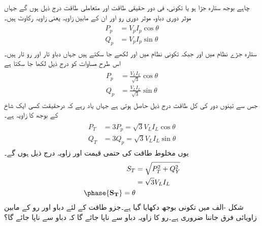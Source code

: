 چاہے بوجھ ستارہ جڑا ہو یا تکونی، فی دور حقیقی طاقت اور  متعاملی طاقت درج ذیل ہوں گے جہاں  موثر دوری دباو،  موثر دوری رو اور  ان کے مابین زاویہ یعنی زاویہ رکاوٹ  ہیں۔
\begin{gather}
\begin{aligned}\label{مساوات_تین_طاقت_حقیقی-متعاملی_الف}
P_p&=V_p I_p \cos \theta\\
Q_p&=V_p I_p \sin \theta
\end{aligned}
\end{gather} 
ستارہ جڑے نظام میں  اور  جبکہ تکونی نظام میں  اور  لکھے جا سکتے ہیں جہاں  دباو تار اور  رو تار ہیں۔ اس طرح  مساوات  کو درج ذیل لکھا جا سکتا ہے
\begin{gather}
\begin{aligned}\label{مساوات_تین_طاقت_حقیقی-متعاملی_ب}
P_p&=\frac{V_L I_L}{\sqrt{3}} \cos \theta\\
Q_p&=\frac{V_L I_L}{\sqrt{3}} \sin \theta
\end{aligned}
\end{gather}
جس سے تینوں دور کی کل طاقت درج ذیل حاصل ہوتی ہے جہاں یاد رہے کہ  درحقیقت کسی ایک شاخ کے  بوجھ کا زاویہ  ہے۔
\begin{gather}
\begin{aligned}\label{مساوات_تین_طاقت_حقیقی-متعاملی_پ}
P_T&=3P_p=\sqrt{3}V_L I_L \cos \theta\\
Q_T&=3Q_p=\sqrt{3}V_L I_L \sin \theta
\end{aligned}
\end{gather}
یوں مخلوط طاقت کی حتمی قیمت اور زاویہ  درج ذیل ہوں گے۔
\begin{gather}
\begin{aligned}
S_T&=\sqrt{P^2_T+Q^2_Y}\\
&=\sqrt{3}V_L I_L\\
\phase{\bf{S}_T}=\theta
\end{aligned}
\end{gather}
شکل -الف میں تکونی بوجھ دکھایا گیا ہے۔جزو طاقت کے لئے دباو اور رو کے مابین زاویائی فرق جاننا ضروری ہے۔رو  کا زاویہ  دباو  سے ناپا جائے گا کہ دباو  سے ناپا جائے گا؟
